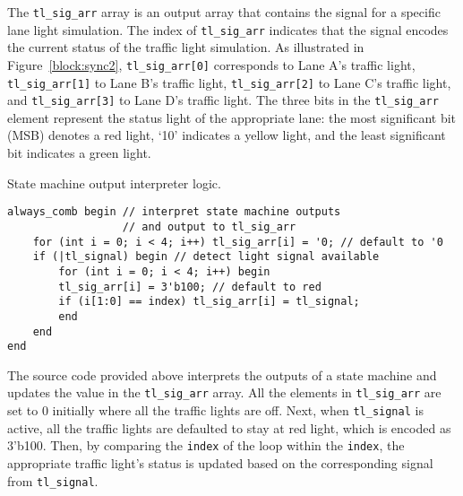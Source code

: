 The \texttt{tl\_sig\_arr} array is an output array that contains the signal for a specific lane light simulation. The index of \texttt{tl\_sig\_arr} indicates that the signal encodes the current status of the traffic light simulation. As illustrated in Figure~\ref{block:sync2},  \texttt{tl\_sig\_arr[0]} corresponds to Lane A's traffic light, \texttt{tl\_sig\_arr[1]} to Lane B's traffic light, \texttt{tl\_sig\_arr[2]} to Lane C's traffic light, and \texttt{tl\_sig\_arr[3]} to Lane D's traffic light. The three bits in the \texttt{tl\_sig\_arr} element represent the status light of the appropriate lane: the most significant bit (MSB) denotes a red light, ‘10’ indicates a yellow light, and the least significant bit indicates a green light.
\begin{listing}[H]
	\caption{State machine output interpreter logic.\label{code:interpreter}}
	\begin{verbatim}
always_comb begin // interpret state machine outputs 
                  // and output to tl_sig_arr
    for (int i = 0; i < 4; i++) tl_sig_arr[i] = '0; // default to '0
    if (|tl_signal) begin // detect light signal available
        for (int i = 0; i < 4; i++) begin
        tl_sig_arr[i] = 3'b100; // default to red
        if (i[1:0] == index) tl_sig_arr[i] = tl_signal;
        end
    end
end
\end{verbatim}
\end{listing}
The source code provided above interprets the outputs of a state machine and updates the value in the \texttt{tl\_sig\_arr} array. All the elements in \texttt{tl\_sig\_arr} are set to 0 initially where all the traffic lights are off. Next, when \texttt{tl\_signal} is active, all the traffic lights are defaulted to stay at red light, which is encoded as 3’b100. Then, by comparing the \texttt{index} of the loop within the \texttt{index}, the appropriate traffic light’s status is updated based on the corresponding signal from \texttt{tl\_signal}.
\newpage
